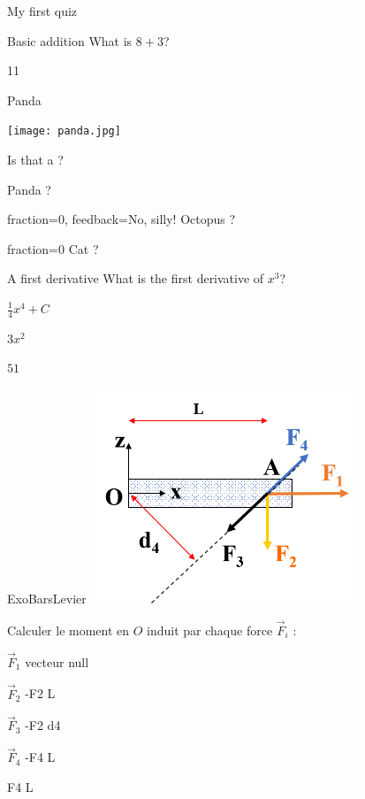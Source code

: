 \documentclass[12pt]{article}
\begin{document}
\begin{quiz}{My first quiz}
\begin{numerical}[points=2]{Basic addition}
What is $8+3$?
\item 11
\end{numerical}

\begin{shortanswer}[case sensitive=true]{Panda}

\texttt{[image: panda.jpg]}

Is that a ?
\item Panda ?
\item[fraction=0, feedback={No, silly!}] Octopus ?
\item{fraction=0} Cat ?
\end{shortanswer}


\begin{multi}[points=3]{A first derivative}
What is the first derivative of $x^3$?
\item  $\frac{1}{4} x^4+C$
\item* $3x^2$
\item  $51$
\end{multi}

\begin{matching}[points=3.]{ExoBarsLevier}
\includegraphics[width = 8cm]{BarsDeLevier}

Calculer le moment en $O$ induit par chaque force $\vec F_i$ :
\item $\vec F_1$ \answer vecteur null
\item $\vec  F_2$ \answer -F2 L
\item $\vec F_3$ \answer -F2 d4 
\item $\vec F_4$ \answer -F4 L 
\item  \answer F4 L 
\end{matching}

\end{quiz}
\end{document}
